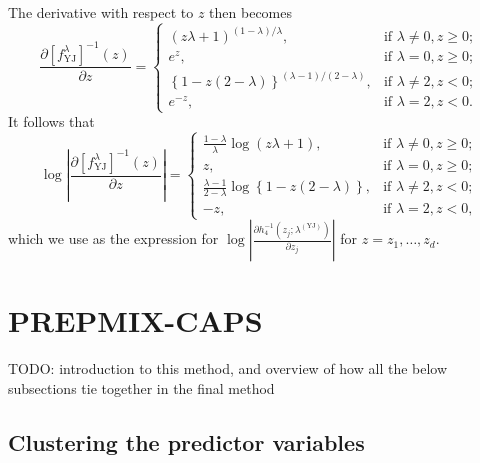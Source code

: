 \documentclass{statsmsc}
\begin{document}
The derivative with respect to $z$ then becomes
\begin{equation}
    \frac{\partial \left[f_{\textrm{YJ}}^\lambda\right]^{-1}(z)}{\partial z}= \left\{
        \begin{array}{ll}
            (z \lambda + 1)^{(1-\lambda)/\lambda}, & \textrm{if } \lambda \neq 0, z \geq 0; \\
            e^z, & \textrm{if } \lambda = 0, z \geq 0;  \\
            \left\{1-z(2-\lambda)\right\}^{(\lambda-1)/(2-\lambda)} , & \textrm{if } \lambda \neq 2, z < 0; \\
            e^{-z}, & \textrm{if } \lambda=2, z < 0.
        \end{array}
    \right.
\end{equation}
It follows that
\begin{equation}
    \log \left|\frac{\partial \left[f_{\textrm{YJ}}^\lambda\right]^{-1}(z)}{\partial z} \right|= \left\{
        \begin{array}{ll}
            \frac{1-\lambda}{\lambda}\log (z \lambda + 1), & \textrm{if } \lambda \neq 0, z \geq 0; \\
            z, & \textrm{if } \lambda = 0, z \geq 0;  \\
            \frac{\lambda - 1}{2-\lambda}\log\left\{1-z(2-\lambda)\right\} , & \textrm{if } \lambda \neq 2, z < 0; \\
            -z, & \textrm{if } \lambda=2, z < 0,
        \end{array}
    \right.
\end{equation}
which we use as the expression for $\log \left| \frac{\partial h_4^{-1}(z_j;\lambda^{(\textrm{YJ})})}{\partial z_j} \right|$ for $z=z_1,\dots,z_d$.


\section{PREPMIX-CAPS}%
\label{sec:PREPMIX-CAPS}

TODO: introduction to this method, and overview of how all the below subsections tie together
in the final method


\subsection{Clustering the predictor variables}%
\label{sub:prepmix-clustering}
\end{document}
